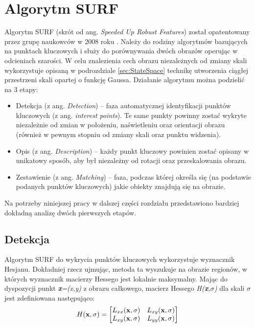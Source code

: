 \section{Algorytm SURF}
Algorytm SURF (skrót od ang. \textit{Speeded Up Robust Features}) został opatentowany przez grupę naukowców w 2008 roku \cite{Surf}. Należy do rodziny algorytmów bazujących na punktach kluczowych i służy do porównywania dwóch obrazów operując w odcieniach szarości. W celu znalezienia cech obrazu niezależnych od zmiany skali wykorzystuje opisaną w podrozdziale \ref{sec:StateSpace} technikę utworzenia ciągłej przestrzeni skali opartej o funkcję Gaussa. Działanie algorytmu można podzielić na 3 etapy:
\begin{itemize}
	\item Detekcja (z ang. \textit{Detection}) – faza automatycznej identyfikacji punktów kluczowych (z ang. \textit{interest points}). Te same punkty powinny zostać wykryte niezależnie od zmian w położeniu, naświetleniu oraz orientacji obrazu (również w pewnym stopniu od zmiany skali oraz punktu widzenia). 
	\item Opis (z ang. \textit{Description}) – każdy punkt kluczowy powinien zostać opisany w unikatowy sposób, aby był niezależny od rotacji oraz przeskalowania obrazu.
	\item Zestawienie (z ang. \textit{Matching}) – faza, podczas której określa się (na podstawie podanych punktów kluczowych) jakie obiekty znajdują się na obrazie. 
\end{itemize}

Na potrzeby niniejszej pracy w dalszej części rozdziału przedstawiono bardziej dokładną analizę dwóch pierwszych etapów.

\subsection{Detekcja}
Algorytm SURF do wykrycia punktów kluczowych wykorzystuje wyznacznik Hesjanu. Dokładniej rzecz ujmując, metoda ta wyszukuje na obrazie regionów, w których wyznacznik macierzy Hessego jest lokalnie maksymalny.
Mając do dyspozycji punkt \textit{\textbf{x}=(x,y)} z obrazu całkowego, macierz Hessego \textit{H(\textbf{x},$\sigma$)} dla skali $\sigma$ jest zdefiniowana następująco:
\begin{equation}\textsl{}
H(\textbf{x},\sigma) = 
\begin{bmatrix}
L_{xx}(\textbf{x},\sigma) & L_{xy}(\textbf{x},\sigma) \\ L_{xy}(\textbf{x},\sigma) & L_{yy}(\textbf{x},\sigma)
\end{bmatrix}
\end{equation}


